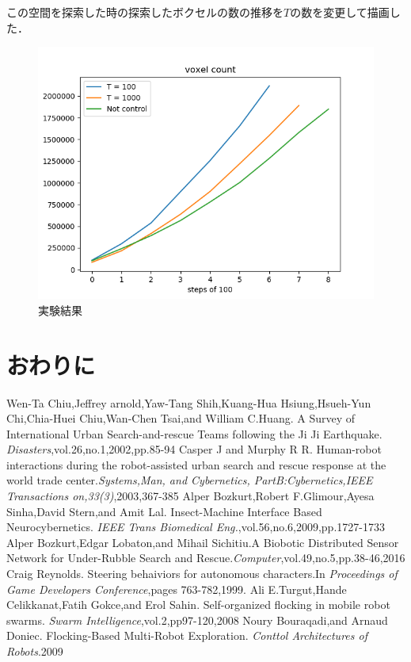 \documentclass[a4paper,11pt]{jarticle}
\begin{document}
	この空間を探索した時の探索したボクセルの数の推移を$T$の数を変更して描画した．
	\begin{figure}
		\centering
		\includegraphics[width=1\linewidth]{png/graph_voxel.png}
		\caption[実験結果]{実験結果}
		\label{fig:graph_voxel}
	\end{figure}
	
	\section{おわりに}
	\label{sec:last}
	\begin{thebibliography}{99}
		 Wen-Ta Chiu,Jeffrey arnold,Yaw-Tang Shih,Kuang-Hua Hsiung,Hsueh-Yun Chi,Chia-Huei Chiu,Wan-Chen Tsai,and William C.Huang. A Survey of International Urban Search-and-rescue Teams following the Ji Ji Earthquake. \textit{Disasters},vol.26,no.1,2002,pp.85-94
		Casper J and Murphy R R. Human-robot interactions during the robot-assisted urban search and rescue response at the world trade center.\textit{Systems,Man, and Cybernetics, PartB:Cybernetics,IEEE Transactions on,33(3)},2003,367-385
		Alper Bozkurt,Robert F.Glimour,Ayesa Sinha,David Stern,and Amit Lal. Insect-Machine Interface Based Neurocybernetics. \textit{IEEE Trans Biomedical Eng.},vol.56,no.6,2009,pp.1727-1733
		Alper Bozkurt,Edgar Lobaton,and Mihail Sichitiu.A Biobotic Distributed Sensor Network for Under-Rubble Search and Rescue.\textit{Computer},vol.49,no.5,pp.38-46,2016
		Craig Reynolds. Steering behaiviors for autonomous characters.In \textit{Proceedings of Game Developers Conference},pages 763-782,1999.
		Ali E.Turgut,Hande Celikkanat,Fatih Gokce,and Erol Sahin. Self-organized flocking in mobile robot swarms. \textit{Swarm Intelligence},vol.2,pp97-120,2008
		Noury Bouraqadi,and Arnaud Doniec. Flocking-Based Multi-Robot Exploration. \textit{Conttol Architectures of Robots}.2009
		
		
	\end{thebibliography}
\end{document}
